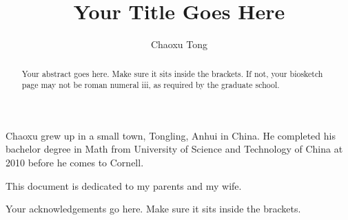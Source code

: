 \documentclass[phd,tocprelim]{cornell}
\title {Your Title Goes Here}
\author {Chaoxu Tong}
\begin{document}
\maketitle
\makecopyright

\begin{abstract}
Your abstract goes here. Make sure it sits inside the brackets. If not,
your biosketch page may not be roman numeral iii, as required by the
graduate school.
\end{abstract}

\begin{biosketch}
Chaoxu grew up in a small town, Tongling, Anhui in China.
He completed his bachelor degree in Math from University of Science and Technology of China
at 2010 before he comes to Cornell.
\end{biosketch}

\begin{dedication}
This document is dedicated to my parents and my wife.
\end{dedication}

\begin{acknowledgements}
Your acknowledgements go here. Make sure it sits inside the brackets.
\end{acknowledgements}

\contentspage
\tablelistpage
\figurelistpage

\normalspacing \setcounter{page}{1} 
\pagestyle{cornell} \addtolength{\parskip}{0.5\baselineskip}





\end{document}
